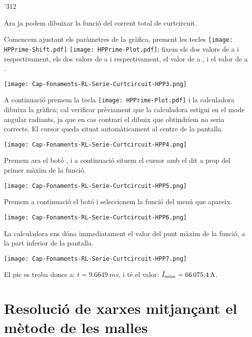 \begin{exemple}
\begin{dingautolist}{'312}
        \item Ara ja podem dibuixar la funció del corrent total de curtcircuit.

            Comencem ajustant els paràmetres de la gràfica, prement les tecles \texttt{[image: HPPrime-Shift.pdf]} \texttt{[image: HPPrime-Plot.pdf]}; fixem els dos valors de  a  i  respectivament, els dos valors de  a  i  respectivament, el valor de  a , i el valor de  a .

            \texttt{[image: Cap-Fonaments-RL-Serie-Curtcircuit-HPP3.png]}

        \item A continuació premem la tecla \texttt{[image: HPPrime-Plot.pdf]} i la calculadora dibuixa la gràfica; cal verificar prèviament que la calculadora estigui en el mode angular radiants, ja que en cas contrari el dibuix que obtindríem no seria correcte. El cursor queda situat automàticament al centre de la pantalla.

            \texttt{[image: Cap-Fonaments-RL-Serie-Curtcircuit-HPP4.png]}

        \item Premem ara el botó , i a continuació situem el cursor amb el dit a prop del primer màxim de la funció.

            \texttt{[image: Cap-Fonaments-RL-Serie-Curtcircuit-HPP5.png]}

        \item Premem a continuació el botó  i seleccionem la funció  del menú que apareix.

            \texttt{[image: Cap-Fonaments-RL-Serie-Curtcircuit-HPP6.png]}

        \item La calculadora ens dóna immediatament el valor del punt màxim de la funció, a la part inferior de la pantalla.

            \texttt{[image: Cap-Fonaments-RL-Serie-Curtcircuit-HPP7.png]}

            El pic es troba doncs a: $t=\SI{9,6649}{ms}$, i té el valor:  $\hat{I}_\mathrm{asim}=\SI{66075,4}{A}$.
    \end{dingautolist}

\end{exemple}


\section{Resolució de xarxes mitjançant el mètode de les malles}\label{sec:metode-malles}

